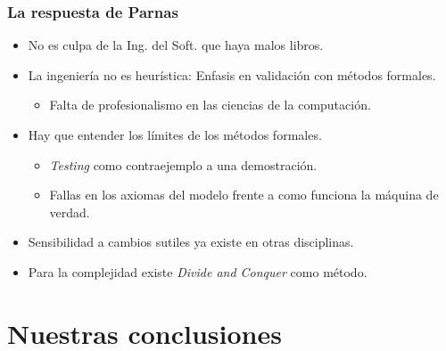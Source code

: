 \documentclass[ignorenonframetext,]{beamer}
\begin{document}
\begin{frame}\frametitle{La respuesta de Parnas}

\begin{itemize}[<+->]
\itemsep1pt\parskip0pt
\item
  No es culpa de la Ing. del Soft. que haya malos libros.
\item
  La ingeniería no es heurística: Enfasis en validación con métodos
  formales.

  \begin{itemize}[<+->]
  \itemsep1pt\parskip0pt
  \item
    Falta de profesionalismo en las ciencias de la computación.
  \end{itemize}
\item
  Hay que entender los límites de los métodos formales.

  \begin{itemize}[<+->]
  \itemsep1pt\parskip0pt
  \item
    \emph{Testing} como contraejemplo a una demostración.
  \item
    Fallas en los axiomas del modelo frente a como funciona la máquina
    de verdad.
  \end{itemize}
\item
  Sensibilidad a cambios sutiles ya existe en otras disciplinas.
\item
  Para la complejidad existe \emph{Divide and Conquer} como método.
\end{itemize}

\end{frame}

\section{Nuestras conclusiones}
\end{document}
